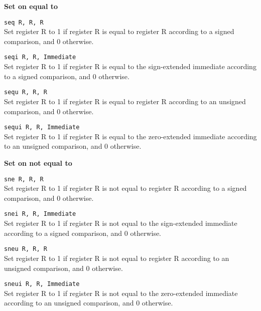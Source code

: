 \documentclass[12pt]{report}
\newcommand\subscr[1]{\raisebox{-0.5ex}{\small #1}}
\newcommand\regs{R\subscr{s}}
\newcommand\regd{R\subscr{d}}
\newcommand\regt{R\subscr{t}}
\begin{document}
\newpage
\noindent
{\bf Set on equal to}

\texttt{seq \regd, \regs, \regt}\\
Set register \regd{} to 1 if register \regs{} is
equal to register \regt{} according to a signed comparison, and 0 otherwise.
\vspace{1ex}

\texttt{seqi \regd, \regs, Immediate}\\
Set register \regd{} to 1 if register \regs{} is
equal to the sign-extended immediate according to a signed comparison, and 0 otherwise.
\vspace{1ex}

\texttt{sequ \regd, \regs, \regt}\\
Set register \regd{} to 1 if register \regs{} is
equal to register \regt{} according to an unsigned comparison, and 0 otherwise.
\vspace{1ex}

\texttt{sequi \regd, \regs, Immediate}\\
Set register \regd{} to 1 if register \regs{} is
equal to the zero-extended immediate according to an unsigned comparison, and 0 otherwise.
\vspace{1ex}

\noindent
{\bf Set on not equal to}

\texttt{sne \regd, \regs, \regt}\\
Set register \regd{} to 1 if register \regs{} is
not equal to register \regt{} according to a signed comparison, and 0 otherwise.
\vspace{1ex}

\texttt{snei \regd, \regs, Immediate}\\
Set register \regd{} to 1 if register \regs{} is
not equal to the sign-extended immediate according to a signed comparison, and 0 otherwise.
\vspace{1ex}

\texttt{sneu \regd, \regs, \regt}\\
Set register \regd{} to 1 if register \regs{} is
not equal to register \regt{} according to an unsigned comparison, and 0 otherwise.
\vspace{1ex}

\texttt{sneui \regd, \regs, Immediate}\\
Set register \regd{} to 1 if register \regs{} is
not equal to the zero-extended immediate according to an unsigned comparison, and 0 otherwise.
\vspace{1ex}
\end{document}
